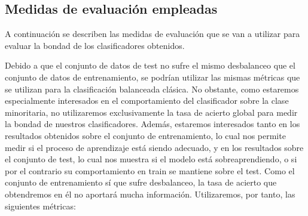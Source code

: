 \documentclass[
  a4paper,
,tablecaptionabove
]{scrartcl}
\begin{document}
\hypertarget{medidas-de-evaluaciuxf3n-empleadas}{%
\subsection{Medidas de evaluación
empleadas}\label{medidas-de-evaluaciuxf3n-empleadas}}

A continuación se describen las medidas de evaluación que se van a
utilizar para evaluar la bondad de los clasificadores obtenidos.

Debido a que el conjunto de datos de test no sufre el mismo desbalanceo
que el conjunto de datos de entrenamiento, se podrían utilizar las
mismas métricas que se utilizan para la clasificación balanceada
clásica. No obstante, como estaremos especialmente interesados en el
comportamiento del clasificador sobre la clase minoritaria, no
utilizaremos exclusivamente la tasa de acierto global para medir la
bondad de nuestros clasificadores. Además, estaremos interesados tanto
en los resultados obtenidos sobre el conjunto de entrenamiento, lo cual
nos permite medir si el proceso de aprendizaje está siendo adecuado, y
en los resultados sobre el conjunto de test, lo cual nos muestra si el
modelo está sobreaprendiendo, o si por el contrario su comportamiento en
train se mantiene sobre el test. Como el conjunto de entrenamiento sí
que sufre desbalanceo, la tasa de acierto que obtendremos en él no
aportará mucha información. Utilizaremos, por tanto, las siguientes
métricas:
\end{document}
